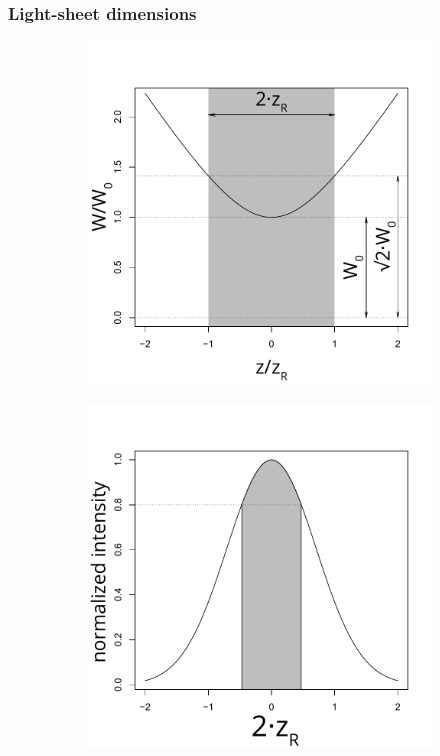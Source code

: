     \subsubsection{Light-sheet dimensions}
    \label{sec:dimensions}
    \begin{figure}
      \centering
      \begin{subfigure}[b]{0.29\textwidth}
          \centering
          \includegraphics[width=\textwidth]{width}
          \caption{}
          \label{fig:width}
      \end{subfigure}
      \begin{subfigure}[b]{0.29\textwidth}
          \centering
          \includegraphics[width=\textwidth]{height}

\end{subfigure}
\end{figure}
